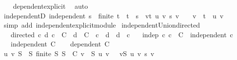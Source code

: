 \begin{isabellebody}
%
\isadelimproof
\ \ %
\endisadelimproof
%
\isatagproof
{}\isamarkupfalse%
\ dependent{\isacharunderscore}{\kern0pt}explicit\ \isamarkupfalse%
\ auto%
\endisatagproof
{\isafoldproof}%
%
\isadelimproof
\isanewline
%
\endisadelimproof
\isanewline
{}\isamarkupfalse%
\ independentD{\isacharcolon}{\kern0pt}\ {\isachardoublequoteopen}independent\ s\ {\isasymLongrightarrow}\ finite\ t\ {\isasymLongrightarrow}\ t\ {\isasymsubseteq}\ s\ {\isasymLongrightarrow}\ {\isacharparenleft}{\kern0pt}{\isasymSum}v{\isasymin}t{\isachardot}{\kern0pt}\ u\ v\ {\isacharasterisk}{\kern0pt}s\ v{\isacharparenright}{\kern0pt}\ {\isacharequal}{\kern0pt}\ {}\ {\isasymLongrightarrow}\ v\ {\isasymin}\ t\ {\isasymLongrightarrow}\ u\ v\ {\isacharequal}{\kern0pt}\ {}{\isachardoublequoteclose}\isanewline
%
\isadelimproof
\ \ %
\endisadelimproof
%
\isatagproof
{}\isamarkupfalse%
\ {\isacharparenleft}{\kern0pt}simp\ add{\isacharcolon}{\kern0pt}\ independent{\isacharunderscore}{\kern0pt}explicit{\isacharunderscore}{\kern0pt}module{\isacharparenright}{\kern0pt}%
\endisatagproof
{\isafoldproof}%
%
\isadelimproof
\isanewline
%
\endisadelimproof
\isanewline
{}\isamarkupfalse%
\ independent{\isacharunderscore}{\kern0pt}Union{\isacharunderscore}{\kern0pt}directed{\isacharcolon}{\kern0pt}\isanewline
\ \ \ directed{\isacharcolon}{\kern0pt}\ {\isachardoublequoteopen}{\isasymAnd}c\ d{\isachardot}{\kern0pt}\ c\ {\isasymin}\ C\ {\isasymLongrightarrow}\ d\ {\isasymin}\ C\ {\isasymLongrightarrow}\ c\ {\isasymsubseteq}\ d\ {\isasymor}\ d\ {\isasymsubseteq}\ c{\isachardoublequoteclose}\isanewline
\ \ \ indep{\isacharcolon}{\kern0pt}\ {\isachardoublequoteopen}{\isasymAnd}c{\isachardot}{\kern0pt}\ c\ {\isasymin}\ C\ {\isasymLongrightarrow}\ independent\ c{\isachardoublequoteclose}\isanewline
\ \ \ {\isachardoublequoteopen}independent\ {\isacharparenleft}{\kern0pt}{\isasymUnion}C{\isacharparenright}{\kern0pt}{\isachardoublequoteclose}\isanewline
%
\isadelimproof
%
\endisadelimproof
%
\isatagproof
{}\isamarkupfalse%
\isanewline
\ \ \isamarkupfalse%
\ {\isachardoublequoteopen}dependent\ {\isacharparenleft}{\kern0pt}{\isasymUnion}C{\isacharparenright}{\kern0pt}{\isachardoublequoteclose}\isanewline
\ \ \isamarkupfalse%
\ \isamarkupfalse%
\ u\ v\ S\ \ S{\isacharcolon}{\kern0pt}\ {\isachardoublequoteopen}finite\ S{\isachardoublequoteclose}\ {\isachardoublequoteopen}S\ {\isasymsubseteq}\ {\isasymUnion}C{\isachardoublequoteclose}\ {\isachardoublequoteopen}v\ {\isasymin}\ S{\isachardoublequoteclose}\ {\isachardoublequoteopen}u\ v\ {\isasymnoteq}\ {}{\isachardoublequoteclose}\ {\isachardoublequoteopen}{\isacharparenleft}{\kern0pt}{\isasymSum}v{\isasymin}S{\isachardot}{\kern0pt}\ u\ v\ {\isacharasterisk}{\kern0pt}s\ v{\isacharparenright}{\kern0pt}\ {\isacharequal}{\kern0pt}\ {}{\isachardoublequoteclose}\isanewline

\end{isabellebody}
